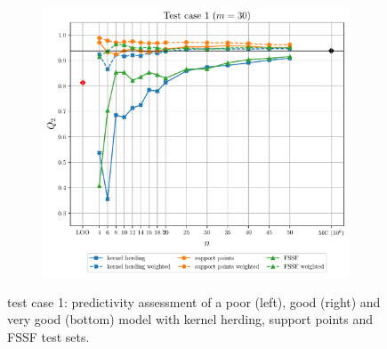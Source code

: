 \begin{figure}
\begin{subfigure}[b]{0.49\linewidth}
  \end{subfigure}
  \\
  \centering
  \begin{subfigure}[b]{0.49\linewidth}
    \centering
    \includegraphics[width=\linewidth]{./part2/figures/SIS/irregular_learnsize_30.pdf}
  \end{subfigure}
  \caption{test case 1: predictivity assessment of a poor (left), good (right) and very good (bottom) model with kernel herding, support points and FSSF test sets.}
  \label{fig:irregular_benchmark}
\end{figure}



